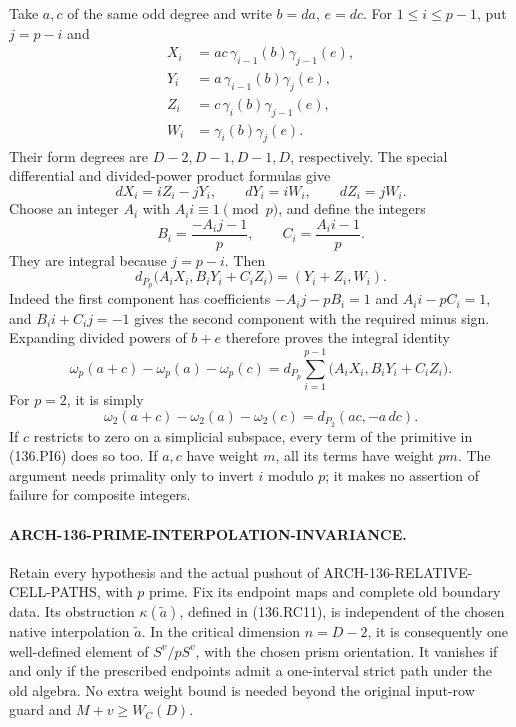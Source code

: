 Take \(a,c\) of the same odd degree and write \(b=da\),
\(e=dc\).  For \(1\leq i\leq p-1\), put \(j=p-i\) and
\[
 \begin{aligned}
 X_i&=a c\,\gamma_{i-1}(b)\gamma_{j-1}(e),\\
 Y_i&=a\,\gamma_{i-1}(b)\gamma_j(e),\\
 Z_i&=c\,\gamma_i(b)\gamma_{j-1}(e),\\
 W_i&=\gamma_i(b)\gamma_j(e).
 \end{aligned}                                                \tag{136.PI2}
\]
Their form degrees are \(D-2,D-1,D-1,D\), respectively.
The special differential and divided-power product formulas give
\[
                dX_i=iZ_i-jY_i,\qquad
                dY_i=iW_i,\qquad dZ_i=jW_i.
                                                               \tag{136.PI3}
\]
Choose an integer \(A_i\) with \(A_i i\equiv1\pmod p\),
and define the integers
\[
       B_i=\frac{-A_i j-1}{p},\qquad
       C_i=\frac{A_i i-1}{p}.
                                                               \tag{136.PI4}
\]
They are integral because \(j=p-i\).  Then
\[
 d_{P_p}\bigl(A_iX_i,B_iY_i+C_iZ_i\bigr)
                                         =(Y_i+Z_i,W_i).
                                                               \tag{136.PI5}
\]
Indeed the first component has coefficients
\(-A_i j-pB_i=1\) and \(A_i i-pC_i=1\), and
\(B_i i+C_i j=-1\) gives the second component with the
required minus sign.  Expanding divided powers of \(b+e\)
therefore proves the integral identity
\[
 \omega_p(a+c)-\omega_p(a)-\omega_p(c)
   =d_{P_p}\sum_{i=1}^{p-1}
                 \bigl(A_iX_i,B_iY_i+C_iZ_i\bigr).
                                                               \tag{136.PI6}
\]
For \(p=2\), it is simply
\[
       \omega_2(a+c)-\omega_2(a)-\omega_2(c)
                             =d_{P_2}(ac,-a\,dc).
                                                               \tag{136.PI7}
\]
If \(c\) restricts to zero on a simplicial subspace, every
term of the primitive in (136.PI6) does so too.  If \(a,c\)
have weight \(m\), all its terms have weight \(pm\).
The argument needs primality only to invert \(i\) modulo
\(p\); it makes no assertion of failure for composite integers.

\paragraph{ARCH-136-PRIME-INTERPOLATION-INVARIANCE.}
Retain every hypothesis and the actual pushout of
ARCH-136-RELATIVE-CELL-PATHS, with \(p\) prime.  Fix its
endpoint maps and complete old boundary data.  Its obstruction
\(\kappa(\widetilde a)\), defined in (136.RC11), is independent
of the chosen native interpolation \(\widetilde a\).
In the critical dimension \(n=D-2\), it is consequently one
well-defined element of \(S^v/pS^v\), with the chosen prism
orientation.  It vanishes if and only if the prescribed endpoints
admit a one-interval strict path under the old algebra.  No extra
weight bound is needed beyond the original input-row guard and
\(M+v\geq W_C(D)\).

